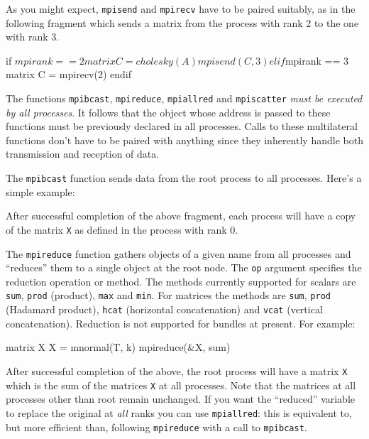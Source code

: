 \documentclass{article}
\begin{document}
As you might expect, \texttt{mpisend} and \texttt{mpirecv} have to be
paired suitably, as in the following fragment which sends a matrix
from the process with rank 2 to the one with rank 3.
\begin{code}
if $mpirank == 2
  matrix C = cholesky(A)
  mpisend(C, 3)
elif $mpirank == 3
  matrix C = mpirecv(2)
endif
\end{code}

The functions \texttt{mpibcast}, \texttt{mpireduce},
\texttt{mpiallred} and \texttt{mpiscatter} \textit{must be executed by
  all processes}. It follows that the object whose address is passed
to these functions must be previously declared in all processes. Calls
to these multilateral functions don't have to be paired with anything
since they inherently handle both transmission and reception of data.

The \texttt{mpibcast} function sends data from the root process to all
processes. Here's a simple example:
After successful completion of the above fragment, each process will
have a copy of the matrix \texttt{X} as defined in the process with
rank 0.

The \texttt{mpireduce} function gathers objects of a given name from
all processes and ``reduces'' them to a single object at the root
node. The \texttt{op} argument specifies the reduction operation or
method. The methods currently supported for scalars are \texttt{sum},
\texttt{prod} (product), \texttt{max} and \texttt{min}. For matrices
the methods are \texttt{sum}, \texttt{prod} (Hadamard product),
\texttt{hcat} (horizontal concatenation) and \texttt{vcat} (vertical
concatenation). Reduction is not supported for bundles at present.
For example:
\begin{code}
matrix X
X = mnormal(T, k)
mpireduce(&X, sum)
\end{code}
After successful completion of the above, the root process will have a
matrix \texttt{X} which is the sum of the matrices \texttt{X} at all
processes. Note that the matrices at all processes other than root
remain unchanged. If you want the ``reduced'' variable to replace the
original at \textit{all} ranks you can use \texttt{mpiallred}: this is
equivalent to, but more efficient than, following \texttt{mpireduce}
with a call to \texttt{mpibcast}.
\end{document}
